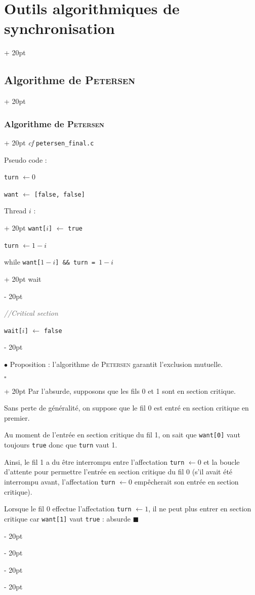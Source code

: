 \documentclass[a4paper, 12pt, twoside]{article}
\newcommand{\ind}[1][20pt]{\advance\leftskip + #1}
\newcommand{\deind}[1][20pt]{\advance\leftskip - #1}
\newenvironment{indt}[2][20pt]{#2 \par \ind[#1]}{\par \deind} %
\newenvironment{proof}[1][{}]{\begin{indt}{$\square$ #1}}{$\blacksquare$ \end{indt}}
\begin{document}
\begin{indt}{\section{Outils algorithmiques de synchronisation}}
\begin{indt}{\subsection{Algorithme de \textsc{Petersen}}}
\begin{indt}{\subsubsection{Algorithme de \textsc{Petersen}}}
                \textit{cf} \texttt{petersen\_final.c}

                Pseudo code :

                \begin{pseudocode}
                    \texttt{turn} $\leftarrow 0$

                    \texttt{want} $\leftarrow$ \texttt{[false, false]}

                    \begin{indt}{Thread $i$ :}
                        \texttt{want[$i$]} $\leftarrow$ \texttt{true}

                        \texttt{turn} $\leftarrow 1 - i$

                        \begin{indt}{while \texttt{want[$1 - i$] \&\& turn = $1 - i$}}
                            wait
                        \end{indt}

                        \textit{\textcolor{656565}{//Critical section}}

                        \texttt{wait[$i$]} $\leftarrow$ \texttt{false}
                    \end{indt}
                \end{pseudocode}

                \vspace{12pt}
                
                $\bullet$ Proposition : l'algorithme de \textsc{Petersen} garantit l'exclusion mutuelle.

                \begin{proof}
                    Par l'absurde, supposons que les fils 0 et 1 sont en section critique.

                    Sans perte de généralité, on suppose que le fil 0 est entré en section critique en premier.

                    Au moment de l'entrée en section critique du fil 1, on sait que \texttt{want[0]} vaut toujours \texttt{true} donc que \texttt{turn} vaut 1.

                    Ainsi, le fil 1 a du être interrompu entre l'affectation \texttt{turn} $\leftarrow 0$ et la boucle d'attente pour permettre l'entrée en section critique du fil 0 (s'il avait été interrompu avant, l'affectation \texttt{turn} $\leftarrow 0$ empêcherait son entrée en section critique).

                    Lorsque le fil 0 effectue l'affectation \texttt{turn} $\leftarrow 1$, il ne peut plus entrer en section critique car \texttt{want[1]} vaut \texttt{true} : absurde
                \end{proof}


\end{indt}
\end{indt}
\end{indt}
\end{document}
